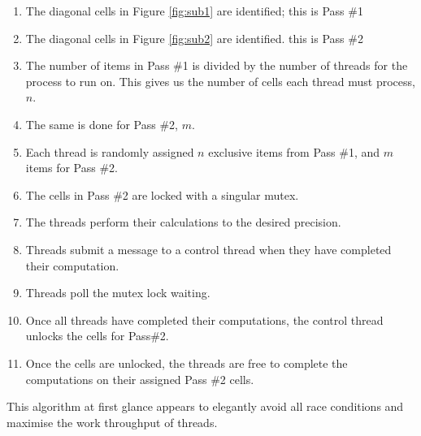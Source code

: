 \documentclass{article}
\begin{document}
\begin{enumerate}
    \item The diagonal cells in Figure \ref{fig:sub1} are identified; this is Pass \#1
    \item The diagonal cells in Figure \ref{fig:sub2} are identified. this is Pass \#2
    \item The number of items in Pass \#1 is divided by the number of threads for the process to run on. This gives us the number of cells each thread must process, $n$.
    \item The same is done for Pass \#2, $m$.
    \item Each thread is randomly assigned $n$ exclusive items from Pass \#1, and $m$ items for Pass \#2.
    \item The cells in Pass \#2 are locked with a singular mutex.
    \item The threads perform their calculations to the desired precision.
    \item Threads submit a message to a control thread when they have completed their computation.
    \item Threads poll the mutex lock waiting. 
    \item Once all threads have completed their computations, the control thread unlocks the cells for Pass\#2.
    \item Once the cells are unlocked, the threads are free to complete the computations on their assigned Pass \#2 cells.
\end{enumerate}
This algorithm at first glance appears to elegantly avoid all race conditions and maximise the work throughput of threads.
\end{document}
